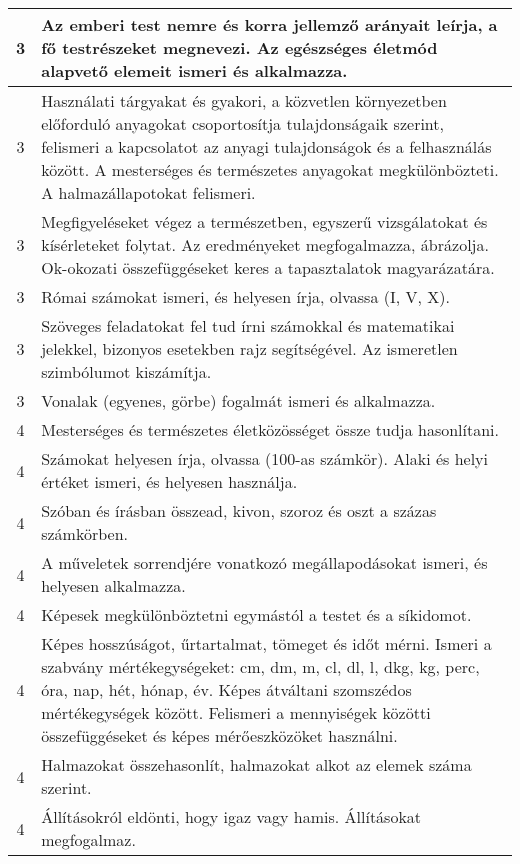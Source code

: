 \begin{longtable}{c | p{12cm} }
                                
                                          3 &  Az emberi test nemre és korra jellemző arányait leírja, a fő testrészeket megnevezi. Az egészséges életmód alapvető elemeit ismeri és alkalmazza. \\ \hline
                                          3 &  Használati tárgyakat és gyakori, a közvetlen környezetben előforduló anyagokat csoportosítja tulajdonságaik szerint, felismeri a kapcsolatot az anyagi tulajdonságok és a felhasználás között. A mesterséges és természetes anyagokat megkülönbözteti. A halmazállapotokat felismeri. \\ \hline
                                          3 &  Megfigyeléseket végez a természetben, egyszerű vizsgálatokat és kísérleteket  folytat. Az eredményeket megfogalmazza, ábrázolja. Ok-okozati összefüggéseket keres a tapasztalatok magyarázatára. \\ \hline
                                          3 &  Római számokat ismeri, és helyesen írja, olvassa (I, V, X). \\ \hline
                                          3 &  Szöveges feladatokat fel tud írni számokkal és matematikai jelekkel, bizonyos esetekben rajz segítségével. Az ismeretlen szimbólumot kiszámítja. \\ \hline
                                          3 &  Vonalak (egyenes, görbe) fogalmát ismeri és alkalmazza. \\ \hline
                                      
                                
                                          4 &  Mesterséges és természetes életközösséget össze tudja hasonlítani. \\ \hline
                                          4 &  Számokat helyesen írja, olvassa (100-as számkör). Alaki és helyi értéket ismeri, és helyesen használja. \\ \hline
                                          4 &  Szóban és írásban összead, kivon, szoroz és oszt a százas számkörben. \\ \hline
                                          4 &  A műveletek sorrendjére vonatkozó megállapodásokat ismeri, és helyesen alkalmazza. \\ \hline
                                          4 &  Képesek megkülönböztetni egymástól a testet és a síkidomot. \\ \hline
                                          4 &  Képes hosszúságot, űrtartalmat, tömeget és időt mérni. Ismeri a szabvány mértékegységeket: cm, dm, m, cl, dl, l, dkg, kg, perc, óra, nap, hét, hónap, év. Képes átváltani szomszédos mértékegységek között. Felismeri a mennyiségek közötti összefüggéseket és képes mérőeszközöket használni. \\ \hline
                                          4 &  Halmazokat összehasonlít, halmazokat alkot az elemek száma szerint. \\ \hline
                                          4 &  Állításokról eldönti, hogy igaz vagy hamis. Állításokat megfogalmaz. \\ \hline
                                      
                        \end{longtable}
